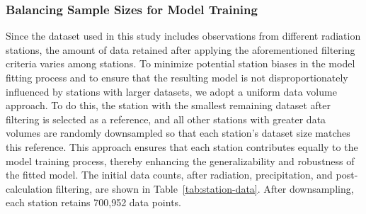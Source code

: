 \documentclass[preprint,12pt]{elsarticle}
\begin{document}
\subsubsection{Balancing Sample Sizes for Model Training}

Since the dataset used in this study includes observations from different radiation stations, the amount of data retained after applying the aforementioned filtering criteria varies among stations. To minimize potential station biases in the model fitting process and to ensure that the resulting model is not disproportionately influenced by stations with larger datasets, we adopt a uniform data volume approach. To do this, the station with the smallest remaining dataset after filtering is selected as a reference, and all other stations with greater data volumes are randomly downsampled so that each station's dataset size matches this reference. This approach ensures that each station contributes equally to the model training process, thereby enhancing the generalizability and robustness of the fitted model. The initial data counts, after radiation, precipitation, and post-calculation filtering, are shown in Table~\ref{tab:station-data}. After downsampling, each station retains 700,952 data points.  

\end{document}
